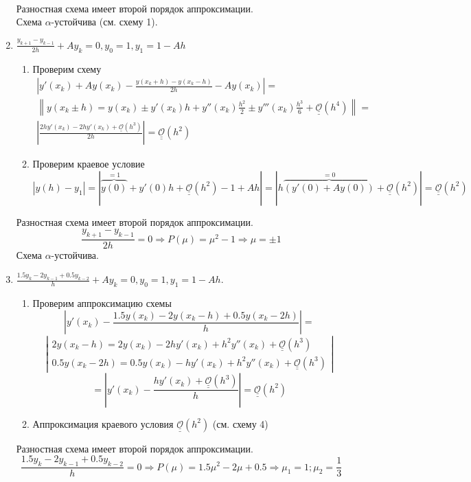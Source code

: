 \documentclass[12pt]{article}
\def\bigO{ \underline{\underline{\mathcal{O}}} }
\begin{document}
\begin{enumerate}
\begin{multline*}
        \end{multline*}
        Разностная схема имеет второй порядок аппроксимации. \\
        Схема $\alpha$-устойчива (см. схему 1).
  \item $\frac{y_{k+1} - y_{k-1}}{2h} + Ay_k = 0, y_0 = 1, y_1 = 1 - Ah$
        \begin{enumerate}
          \item Проверим схему
                \begin{multline*}
                  \left|y'(x_k)+Ay(x_k)-\frac{y(x_k+h)-y(x_k-h)}{2h}-Ay(x_k)\right|=\\
                  \left\|y(x_k\pm h)=y(x_k)\pm y'(x_k)h + y''(x_k)\frac{h^2}{2}\pm y'''(x_k)\frac{h^3}{6}+\bigO(h^4)\right\| = \\
                  \left|\frac{2hy'(x_k)-2hy'(x_k)+\bigO(h^3)}{2h}\right| = \bigO(h^2)
                \end{multline*}
          \item Проверим краевое условие
                \[|y(h)-y_1|=|\overbrace{y(0)}^{=1}+y'(0)h+\bigO(h^2)-1+Ah|=|h\overbrace{(y'(0)+Ay(0))}^{=0}+\bigO(h^2)|=\bigO(h^2)\]
        \end{enumerate}
        Разностная схема имеет второй порядок аппроксимации.
        \[\frac{y_{k+1}-y_{k-1}}{2h}=0\Rightarrow P(\mu)=\mu^2-1\Rightarrow \mu=\pm 1\]
        Схема $\alpha$-устойчива.
  \item $\frac{1.5y_{k} - 2y_{k-1} + 0.5y_{k-2}}{h}+Ay_k= 0, y_0 = 1, y_1 = 1 - Ah.$
        \begin{enumerate}
          \item Проверим аппроксимацию схемы
                \[\left|y'(x_k)-\frac{1.5y(x_k)-2y(x_k-h)+0.5y(x_k-2h)}{h}\right|=\]
                \[\left|\begin{array}{c}
                    2y(x_k-h)=2y(x_k)-2hy'(x_k)+h^2y''(x_k) +\bigO(h^3) \\
                    0.5y(x_k-2h)=0.5y(x_k)-hy'(x_k)+h^2y''(x_k)+\bigO(h^3)
                  \end{array}\right|\]
                \[=\left|y'(x_k)-\frac{hy'(x_k)+\bigO(h^3)}{h}\right|=\bigO(h^2)\]
          \item Аппроксимация краевого условия $\bigO(h^2)$ (см. схему 4)
        \end{enumerate}
        Разностная схема имеет второй порядок аппроксимации.
        \[\frac{1.5y_k-2y_{k-1}+0.5y_{k-2}}{h}=0\Rightarrow P(\mu)=1.5\mu^2-2\mu+0.5\Rightarrow\mu_1=1;\mu_2=\frac{1}{3}\]

\end{enumerate}
\end{document}
